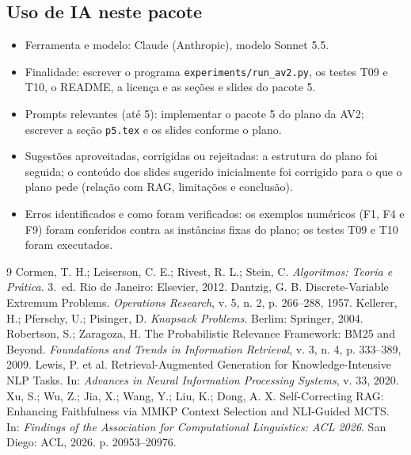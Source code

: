 \subsection*{Uso de IA neste pacote}
\begin{itemize}
  \item Ferramenta e modelo: Claude (Anthropic), modelo Sonnet 5.5.
  \item Finalidade: escrever o programa \texttt{experiments/run\_av2.py}, os testes T09 e T10, o README, a licença e as seções e slides do pacote 5.
  \item Prompts relevantes (até 5): implementar o pacote 5 do plano da AV2; escrever a seção \texttt{p5.tex} e os slides conforme o plano.
  \item Sugestões aproveitadas, corrigidas ou rejeitadas: a estrutura do plano foi seguida; o conteúdo dos slides sugerido inicialmente foi corrigido para o que o plano pede (relação com RAG, limitações e conclusão).
  \item Erros identificados e como foram verificados: os exemplos numéricos (F1, F4 e F9) foram conferidos contra as instâncias fixas do plano; os testes T09 e T10 foram executados.
\end{itemize}

\begin{thebibliography}{9}
 Cormen, T. H.; Leiserson, C. E.; Rivest, R. L.; Stein, C. \emph{Algoritmos: Teoria e Prática}. 3.\ ed. Rio de Janeiro: Elsevier, 2012.
 Dantzig, G. B. Discrete-Variable Extremum Problems. \emph{Operations Research}, v. 5, n. 2, p. 266--288, 1957.
 Kellerer, H.; Pferschy, U.; Pisinger, D. \emph{Knapsack Problems}. Berlim: Springer, 2004.
 Robertson, S.; Zaragoza, H. The Probabilistic Relevance Framework: BM25 and Beyond. \emph{Foundations and Trends in Information Retrieval}, v. 3, n. 4, p. 333--389, 2009.
 Lewis, P. et al. Retrieval-Augmented Generation for Knowledge-Intensive NLP Tasks. In: \emph{Advances in Neural Information Processing Systems}, v. 33, 2020.
 Xu, S.; Wu, Z.; Jia, X.; Wang, Y.; Liu, K.; Dong, A. X. Self-Correcting RAG: Enhancing Faithfulness via MMKP Context Selection and NLI-Guided MCTS. In: \emph{Findings of the Association for Computational Linguistics: ACL 2026}. San Diego: ACL, 2026. p. 20953--20976.
\end{thebibliography}
